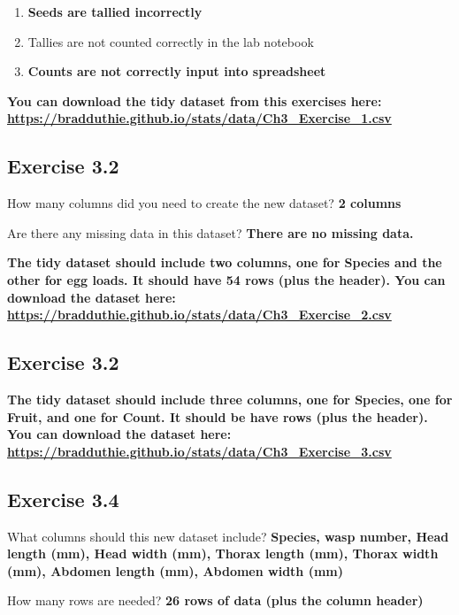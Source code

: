 \documentclass[
  openany]{krantz}
\providecommand{\tightlist}{%
  \setlength{\itemsep}{0pt}\setlength{\parskip}{0pt}}
\begin{document}
\begin{enumerate}
\def\labelenumi{\arabic{enumi}.}
\tightlist
\item
  \textbf{Seeds are tallied incorrectly}
\item
  Tallies are not counted correctly in the lab notebook
\item
  \textbf{Counts are not correctly input into spreadsheet}
\end{enumerate}

\textbf{You can download the tidy dataset from this exercises here: \url{https://bradduthie.github.io/stats/data/Ch3_Exercise_1.csv}}

\hypertarget{exercise-3.2}{%
\subsection{Exercise 3.2}\label{exercise-3.2}}

How many columns did you need to create the new dataset? \textbf{2 columns}

Are there any missing data in this dataset? \textbf{There are no missing data.}

\textbf{The tidy dataset should include two columns, one for Species and the other for egg loads. It should have 54 rows (plus the header). You can download the dataset here: \url{https://bradduthie.github.io/stats/data/Ch3_Exercise_2.csv}}

\hypertarget{exercise-3.2-1}{%
\subsection{Exercise 3.2}\label{exercise-3.2-1}}

\textbf{The tidy dataset should include three columns, one for Species, one for Fruit, and one for Count. It should be have rows (plus the header). You can download the dataset here: \url{https://bradduthie.github.io/stats/data/Ch3_Exercise_3.csv}}

\hypertarget{exercise-3.4}{%
\subsection{Exercise 3.4}\label{exercise-3.4}}

What columns should this new dataset include? \textbf{Species, wasp number, Head length (mm), Head width (mm), Thorax length (mm), Thorax width (mm), Abdomen length (mm), Abdomen width (mm)}

How many rows are needed? \textbf{26 rows of data (plus the column header)}
\end{document}
